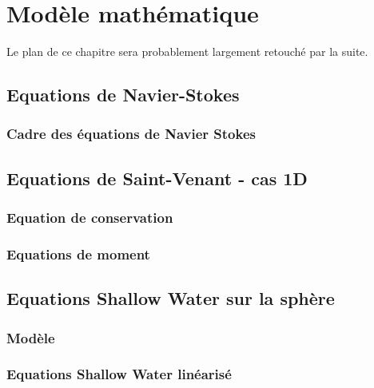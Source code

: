 
\chapter{Modèle mathématique}

Le plan de ce chapitre sera probablement largement retouché par la suite.

\section{Equations de Navier-Stokes}

\subsection{Cadre des équations de Navier Stokes}

\section{Equations de Saint-Venant - cas 1D}

\subsection{Equation de conservation}

\subsection{Equations de moment}

\section{Equations Shallow Water sur la sphère}

\subsection{Modèle}

\subsection{Equations Shallow Water linéarisé}
